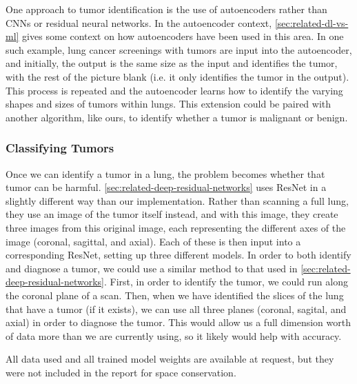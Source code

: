 \documentclass[10pt,twocolumn,letterpaper]{article}
\begin{document}
         One approach to tumor identification is the use of autoencoders rather than CNNs or residual neural networks. In the autoencoder context, \ref{sec:related-dl-vs-ml} gives some context on how autoencoders have been used in this area. In one such example, lung cancer screenings with tumors are input into the autoencoder, and initially, the output is the same size as the input and identifies the tumor, with the rest of the picture blank (i.e. it only identifies the tumor in the output). This process is repeated and the autoencoder learns how to identify the varying shapes and sizes of tumors within lungs. This extension could be paired with another algorithm, like ours, to identify whether a tumor is malignant or benign. 

      \subsubsection{Classifying Tumors} \label{sec:classify-tumor}

         Once we can identify a tumor in a lung, the problem becomes whether that tumor can be harmful. \ref{sec:related-deep-residual-networks} uses ResNet in a slightly different way than our implementation. Rather than scanning a full lung, they use an image of the tumor itself instead, and with this image, they create three images from this original image, each representing the different axes of the image (coronal, sagittal, and axial). Each of these is then input into a corresponding ResNet, setting up three different models. In order to both identify and diagnose a tumor, we could use a similar method to that used in \ref{sec:related-deep-residual-networks}. First, in order to identify the tumor, we could run along the coronal plane of a scan. Then, when we have identified the slices of the lung that have a tumor (if it exists), we can use all three planes (coronal, sagital, and axial) in order to diagnose the tumor. This would allow us a full dimension worth of data more than we are currently using, so it likely would help with accuracy. 


  All data used and all trained model weights are available at request, but they were not included in the report for space conservation.


{\small



}
\end{document}
